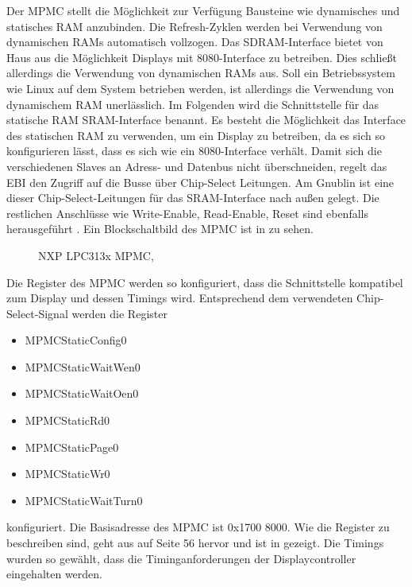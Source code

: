 Der MPMC stellt die Möglichkeit zur Verfügung Bausteine wie dynamisches und statisches RAM anzubinden. Die Refresh-Zyklen werden bei Verwendung von dynamischen RAMs automatisch vollzogen. Das SDRAM-Interface bietet von Haus aus die Möglichkeit Displays mit 8080-Interface zu betreiben. Dies schließt allerdings die Verwendung von dynamischen RAMs aus. Soll ein Betriebssystem wie Linux auf dem System betrieben werden, ist allerdings die Verwendung von dynamischem RAM unerlässlich. Im Folgenden wird die Schnittstelle für das statische RAM SRAM-Interface benannt. Es besteht die Möglichkeit das Interface des statischen RAM zu verwenden, um ein Display zu betreiben, da es sich so konfigurieren lässt, dass es sich wie ein 8080-Interface verhält. Damit sich die verschiedenen Slaves an Adress- und Datenbus nicht überschneiden, regelt das EBI den Zugriff auf die Busse über Chip-Select Leitungen. Am Gnublin ist eine dieser Chip-Select-Leitungen für das SRAM-Interface nach außen gelegt. Die restlichen Anschlüsse wie Write-Enable, Read-Enable, Reset sind ebenfalls herausgeführt \cite{NXP2010}. Ein Blockschaltbild des MPMC ist in  zu sehen.


\begin{figure}[tbph]
	\centering
{}
	\caption{NXP LPC313x MPMC, \cite{NXP2010} }
	\label{fig:lpc_mpmc}
\end{figure}
\newpage
Die Register des MPMC werden so konfiguriert, dass die Schnittstelle kompatibel zum Display und dessen Timings wird. Entsprechend dem verwendeten Chip-Select-Signal werden die Register \begin{itemize}
\item MPMCStaticConfig0\item  MPMCStaticWaitWen0\item  MPMCStaticWaitOen0\item  MPMCStaticRd0\item  MPMCStaticPage0\item  MPMCStaticWr0 \item MPMCStaticWaitTurn0 \end{itemize} konfiguriert. Die Basisadresse des MPMC ist 0x1700 8000. Wie die Register zu beschreiben sind, geht aus \cite{NXP2010} auf Seite 56 hervor und ist in  gezeigt. Die Timings wurden so gewählt, dass die Timinganforderungen der Displaycontroller eingehalten werden.

